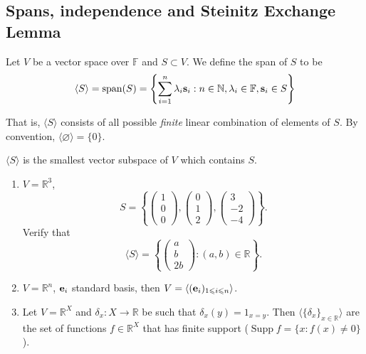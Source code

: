 \documentclass[a4paper]{article}
\begin{document}
\subsection{Spans, independence and Steinitz Exchange Lemma}
\begin{definition}
    Let $V$ be a vector space over $\mathbb F$ and $S\subset V$.
    We define the span of $S$ to be
    $$\langle S\rangle=\operatorname{span}(S)=\left\{\sum_{i=1}^n\lambda_i{\bf s}_i:n\in\mathbb N,\lambda_i\in \mathbb F,{\bf s}_i\in S\right\}$$
\end{definition}
That is, $\langle S\rangle$ consists of all possible \textit{finite} linear combination of elements of $S$.
By convention, $\langle \varnothing\rangle=\{0\}$.
\begin{remark}
    $ \langle S \rangle  $ is the smallest vector subspace of $V$ which contains $S$.
\end{remark}
\begin{example}
    \begin{enumerate}
        \item $V=\mathbb{R}^{3}$,
        \[
            S = \left\{\begin{pmatrix}
                1 \\ 0 \\ 0
            \end{pmatrix}, \begin{pmatrix}
                0 \\ 1 \\ 2
            \end{pmatrix}, \begin{pmatrix}
                3 \\ -2 \\ -4
            \end{pmatrix}\right\}.
        \]
        Verify that 
        \[
            \langle S \rangle = \left\{ \begin{pmatrix}
                a \\ b \\ 2b
            \end{pmatrix}:(a,b)\in \mathbb{R} \right\}.
        \]
        \item $ V = \mathbb{R}^{n} $, ${\bf e}_i$ standard basis, then $ V = \langle ({\bf e}_i)_{1\leqslant i\leqslant n} \rangle  $.
        \item Let $V=\mathbb R^X$ and $\delta_x:X\to\mathbb R$ be such that $\delta_x(y)=1_{x=y}$.
        Then $\langle \{\delta_x\}_{x\in\mathbb R}\rangle$ are the set of functions $f\in\mathbb R^X$ that has finite support ($ \operatorname{Supp} f = \{x:f(x)\neq 0\} $).
    \end{enumerate}
\end{example}
\end{document}
